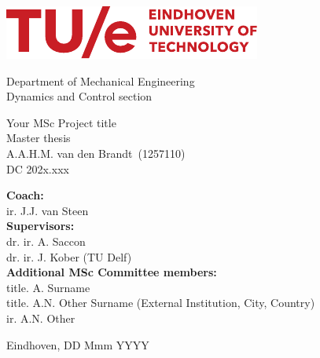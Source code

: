 \documentclass[11pt]{report}
\numberwithin{equation}{chapter}		%
\numberwithin{figure}{chapter}			%
\numberwithin{table}{chapter}			%
\newcommand{\deltitle}{Your MSc Project title}        %
\newcommand{\StudentName}{A.A.H.M. van den Brandt}               %
\newcommand{\StudentID}{1257110}                    %
\newcommand{\DCcode}{202x.xxx}                      %
\begin{document}
	\hypersetup{pageanchor=false}
	\begin{titlepage}
	\centering
	\includegraphics[scale=1.9]{graphics/TUE-logo.pdf}\\[0mm]
	\begin{center}
		{\Large Department of Mechanical Engineering}\\[2mm]
		{\Large Dynamics and Control section}\\[20mm]
	\end{center}

	\begin{center}
		{\Huge \deltitle}\\[2mm]
		{\Large Master thesis}\\[2mm]
		{\large \StudentName \ (\StudentID)}\\[1mm]
		{\large DC \DCcode}\\[70mm]
	\end{center}
		
	\flushleft\large {\textbf{Coach:}} \\
	{ir. J.J. van Steen}   \\    


	\flushleft\large {\textbf{Supervisors:}} \\
	{dr. ir. A. Saccon}             \\
	{dr. ir. J. Kober (TU Delf)}             \\

	\flushleft\large {\textbf{Additional MSc Committee members:}} \\
	{title. A. Surname}  \\  
	{title. A.N. Other Surname (External Institution, City, Country)}  \\  %
	{ir. A.N. Other}                 

	\vfill\center Eindhoven, DD Mmm YYYY \\ %
		
	\end{titlepage}
\end{document}
